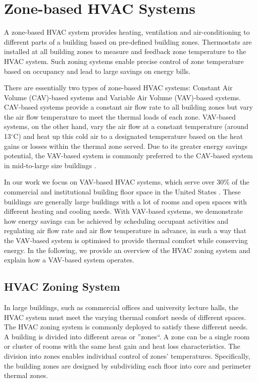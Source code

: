 \section{Zone-based HVAC Systems} \label{cha:bg:hvac}

A zone-based HVAC system provides heating, ventilation and air-conditioning to different parts of a building based on pre-defined building zones. Thermostats are installed at all building zones to measure and feedback zone temperature to the HVAC system. Such zoning systems enable precise control of zone temperature based on occupancy and lead to large savings on energy bills. 

There are essentially two types of zone-based HVAC systems: Constant Air Volume (CAV)-based systems and Variable Air Volume (VAV)-based systems. CAV-based systems provide a constant air flow rate to all building zones but vary the air flow temperature to meet the thermal loads of each zone. VAV-based systems, on the other hand, vary the air flow at a constant temperature (around 13$^{\circ}\mathrm{C}$) and heat up this cold air to a designated temperature based on the heat gains or losses within the thermal zone served. Due to its greater energy savings potential, the VAV-based system is commonly preferred to the CAV-based system in mid-to-large size buildings \citep{sekhar1997critical,yao2007evaluation}.

In our work we focus on VAV-based HVAC systems, which serve over 30\% of the commercial and institutional building floor space in the United States \citep{eia2012cbecs}. These buildings are generally large buildings with a lot of rooms and open spaces with different heating and cooling needs. With VAV-based systems, we demonstrate how energy savings can be achieved by scheduling occupant activities and regulating air flow rate and air flow temperature in advance, in such a way that the VAV-based system is optimised to provide thermal comfort while conserving energy. In the following, we provide an overview of the HVAC zoning system and explain how a VAV-based system operates.%

\subsection{HVAC Zoning System}

In large buildings, such as commercial offices and university lecture halls, the HVAC system must meet the varying thermal comfort needs of different spaces. The HVAC zoning system is commonly deployed to satisfy these different needs. A building is divided into different areas or ''zones``. A zone can be a single room or cluster of rooms with the same heat gain and heat loss characteristics. The division into zones enables individual control of zones' temperatures. Specifically, the building zones are designed by subdividing each floor into core and perimeter thermal zones. 

